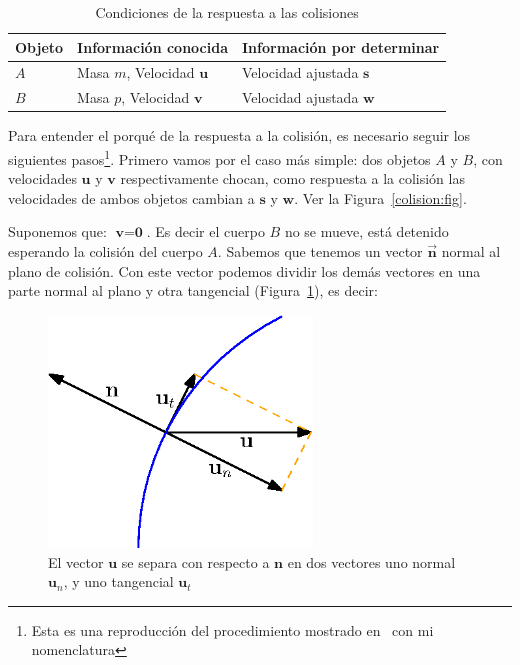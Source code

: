 \begin{table}
\begin{center}
\begin{tabular} {@{}lll@{}}
\toprule
Objeto & Información conocida & Información por determinar \\
\midrule
$A$ & Masa $m$, Velocidad $\textbf{u}$ & Velocidad ajustada $\textbf{s}$ \\
$B$ & Masa $p$, Velocidad $\textbf{v}$ & Velocidad ajustada $\textbf{w}$ \\
\bottomrule
\end{tabular}
\end{center}
\caption{Condiciones de la respuesta a las colisiones}
\label{condiciones:Colision}
\end{table}

Para entender el porqué de la respuesta a la colisión, es necesario seguir los siguientes pasos\footnote{Esta es una reproducción del procedimiento mostrado en~\cite{FisicaMatematicasVideojuegos} con mi nomenclatura}.
Primero vamos por el caso más simple: dos objetos $A$ y $B$, con velocidades $\textbf{u}$ y $\textbf{v}$ respectivamente chocan, como respuesta a la colisión las velocidades de ambos objetos cambian a $\textbf{s}$ y $\textbf{w}$.
Ver la Figura~\ref{colision:fig}.

Suponemos que: $\textbf{v} = \textbf{0}$. Es decir el cuerpo $B$ no se mueve, está detenido esperando la colisión del cuerpo $A$. Sabemos que tenemos un vector $\vec{\textbf{n}}$ normal al plano de colisión.
Con este vector podemos dividir los demás vectores en una parte normal al plano y otra tangencial  (Figura~\ref{comVec:fig}), es decir:

\begin{figure}
 \centering
 \includegraphics[width=7cm]{Img/02/vector_componente}
 \caption[Separar componente tangencial y normal de un vector]{ 
 El vector $\textbf{u}$ se separa con respecto a $\textbf{n}$ en dos vectores uno normal $\textbf{u}_n$, y uno tangencial $\textbf{u}_t$ 
 } \label{comVec:fig}
\end{figure}

